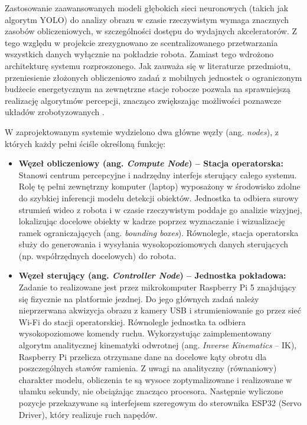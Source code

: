 \documentclass[11pt]{extreport}
\begin{document}
Zastosowanie zaawansowanych modeli głębokich sieci neuronowych (takich jak algorytm YOLO) do analizy obrazu w czasie rzeczywistym wymaga znacznych zasobów obliczeniowych, w szczególności dostępu do wydajnych akceleratorów. Z tego względu w projekcie zrezygnowano ze scentralizowanego przetwarzania wszystkich danych wyłącznie na pokładzie robota. Zamiast tego wdrożono architekturę systemu rozproszonego. Jak zauważa się w literaturze przedmiotu, przeniesienie złożonych obliczeniowo zadań z mobilnych jednostek o ograniczonym budżecie energetycznym na zewnętrzne stacje robocze pozwala na sprawniejszą realizację algorytmów percepcji, znacząco zwiększając możliwości poznawcze układów zrobotyzowanych \cite{siegwart2011introduction}.

W zaprojektowanym systemie wydzielono dwa główne węzły (ang. \textit{nodes}), z których każdy pełni ściśle określoną funkcję:

\begin{itemize}
    \item \textbf{Węzeł obliczeniowy (ang. \textit{Compute Node}) -- Stacja operatorska:}
    Stanowi centrum percepcyjne i nadrzędny interfejs sterujący całego systemu. Rolę tę pełni zewnętrzny komputer (laptop) wyposażony w środowisko zdolne do szybkiej inferencji modelu detekcji obiektów. Jednostka ta odbiera surowy strumień wideo z robota i w czasie rzeczywistym poddaje go analizie wizyjnej, lokalizując docelowe obiekty w kadrze poprzez wyznaczanie i wizualizację ramek ograniczających (ang. \textit{bounding boxes}). Równolegle, stacja operatorska służy do generowania i wysyłania wysokopoziomowych danych sterujących (np. współrzędnych docelowych) do robota.
    
    \item \textbf{Węzeł sterujący (ang. \textit{Controller Node}) -- Jednostka pokładowa:}
    Zadanie to realizowane jest przez mikrokomputer Raspberry Pi 5 znajdujący się fizycznie na platformie jezdnej. Do jego głównych zadań należy nieprzerwana akwizycja obrazu z kamery USB i strumieniowanie go przez sieć Wi-Fi do stacji operatorskiej. Równolegle jednostka ta odbiera wysokopoziomowe komendy ruchu. Wykorzystując zaimplementowany algorytm analitycznej kinematyki odwrotnej (ang. \textit{Inverse Kinematics} -- IK), Raspberry Pi przelicza otrzymane dane na docelowe kąty obrotu dla poszczególnych stawów ramienia. Z uwagi na analityczny (równaniowy) charakter modelu, obliczenia te są wysoce zoptymalizowane i realizowane w ułamku sekundy, nie obciążając znacząco procesora. Następnie wyliczone pozycje przekazywane są interfejsem szeregowym do sterownika ESP32 (Servo Driver), który realizuje ruch napędów.
\end{itemize}
\end{document}
